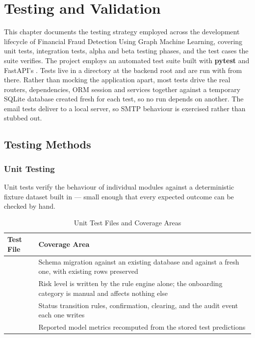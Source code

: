 \chapter{Testing and Validation}

This chapter documents the testing strategy employed across the development lifecycle of Financial Fraud Detection Using Graph Machine Learning, covering unit tests, integration tests, alpha and beta testing phases, and the test cases the suite verifies. The project employs an automated test suite built with \textbf{pytest} and FastAPI's . Tests live in a  directory at the backend root and are run with  from there. Rather than mocking the application apart, most tests drive the real routers, dependencies, ORM session and services together against a temporary SQLite database created fresh for each test, so no run depends on another. The email tests deliver to a local  server, so SMTP behaviour is exercised rather than stubbed out.

\section{Testing Methods}

\subsection{Unit Testing}
Unit tests verify the behaviour of individual modules against a deterministic fixture dataset built in  --- small enough that every expected outcome can be checked by hand.

\begin{table}[H]
\centering
\caption{Unit Test Files and Coverage Areas}
\label{tab:unittests}
\small
\begin{tabular}{@{}L{5.2cm}L{6.6cm}@{}}
\toprule
\textbf{Test File} & \textbf{Coverage Area} \\
\midrule
{} & Schema migration against an existing database and against a fresh one, with existing rows preserved \\
 & Risk level is written by the rule engine alone; the onboarding category is manual and affects nothing else \\
 & Status transition rules, confirmation, clearing, and the audit event each one writes \\
 & Reported model metrics recomputed from the stored test predictions \\
\bottomrule
\end{tabular}
\end{table}

